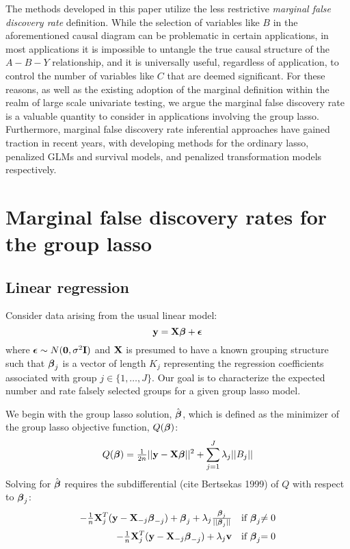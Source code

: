 The methods developed in this paper utilize the less restrictive \textit{marginal false discovery rate} definition.  While the selection of variables like $B$ in the aforementioned causal diagram can be problematic in certain applications, in most applications it is impossible to untangle the true causal structure of the $A-B-Y$ relationship, and it is universally useful, regardless of application, to control the number of variables like $C$ that are deemed significant.  For these reasons, as well as the existing adoption of the marginal definition within the realm of large scale univariate testing, we argue the marginal false discovery rate is a valuable quantity to consider in applications involving the group lasso.  Furthermore, marginal false discovery rate inferential approaches have gained traction in recent years, with \citet{Breheny2019, Miller2019, Liang2021} developing methods for the ordinary lasso, penalized GLMs and survival models, and penalized transformation models respectively.

\section{Marginal false discovery rates for the group lasso}

\subsection{Linear regression}

Consider data arising from the usual linear model:
\begin{equation}
\mathbf{y} = \mathbf{X}\boldsymbol{\beta} + \boldsymbol{\epsilon}
\end{equation}
where $\boldsymbol{\epsilon} \sim N(\mathbf{0}, \sigma^2\mathbf{I})$ and $\mathbf{X}$ is presumed to have a known grouping structure such that $\boldsymbol{\beta}_j$ is a vector of length $K_j$ representing the regression coefficients associated with group $j \in \{1, \ldots, J\}$.  Our goal is to characterize the expected number and rate falsely selected groups for a given group lasso model.

We begin with the group lasso solution, $\hat{\boldsymbol{\beta}}$, which is defined as the minimizer of the group lasso objective function, $Q(\boldsymbol{\beta})$:
\begin{equation}
Q(\boldsymbol{\beta}) = \tfrac{1}{2n}||\mathbf{y} - \mathbf{X}\boldsymbol{\beta}||^2 + \sum_{j = 1}^{J}\lambda_j ||B_j||
\end{equation}
Solving for $\hat{\boldsymbol{\beta}}$ requires the subdifferential (cite Bertsekas 1999) of $Q$ with respect to $\boldsymbol{\beta}_j$:
\begin{equation}
  \label{eq:kkt}
  \begin{alignedat}{2}
  -\tfrac{1}{n}\mathbf{X}_j^T(\mathbf{y} - \mathbf{X}_{-j}\boldsymbol{\beta}_{-j}) + \boldsymbol{\beta}_j + \lambda_j\tfrac{\boldsymbol{\beta}_j}{||\boldsymbol{\beta}_j||}  &\quad \text{if } \boldsymbol{\beta}_j &\neq 0 \\
  -\tfrac{1}{n}\mathbf{X}_j^T(\mathbf{y} - \mathbf{X}_{-j}\boldsymbol{\beta}_{-j}) + \lambda_j\mathbf{v}  &\quad \text{if }  \boldsymbol{\beta}_j &= 0
  \end{alignedat}
\end{equation}

